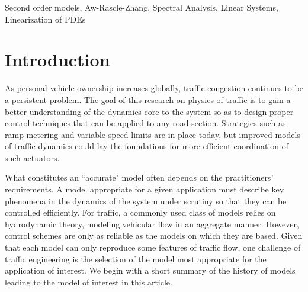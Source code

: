 \documentclass[preprint]{elsarticle}
\begin{document}
\begin{frontmatter}
\begin{keyword}
Second order models, Aw-Rascle-Zhang, Spectral Analysis, Linear Systems, Linearization of PDEs
\end{keyword}

\end{frontmatter}


\section{Introduction}

As personal vehicle ownership increases globally, traffic congestion
continues to be a persistent problem. The goal of this research on physics of traffic is to gain a better understanding of the dynamics core to the system so as to design proper control techniques that can be applied to any road section. Strategies such as
ramp metering and variable speed limits are in place today, but improved models of traffic dynamics could lay the foundations for more efficient coordination of such actuators. 

What constitutes an ``accurate" model often depends on the practitioners' requirements. A model appropriate for a given application must describe key phenomena in the dynamics of the system under scrutiny so that they can be controlled efficiently. For traffic, a commonly used class of models relies on hydrodynamic theory, modeling vehicular flow in an aggregate manner. However, control schemes are only as reliable as the models on which they are based. Given that each model can only reproduce some features of traffic flow, one challenge of traffic engineering is the selection of the model most appropriate for the application of interest. We begin with a short summary of the history of models leading to the model of interest in this article.
\end{document}
